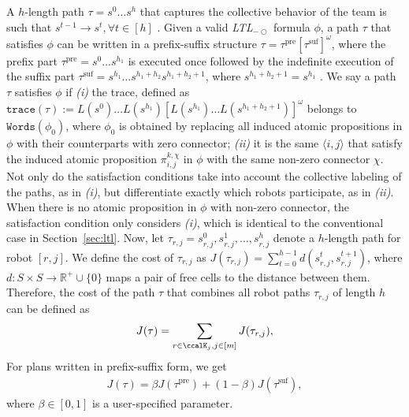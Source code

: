 \documentclass[Afour,sageh,times]{sagej}
\newcommand{\ltl}{ {\it LTL}$_{-\bigcirc}$ }
\newcommand{\ag}[2]{\langle#1,#2\rangle}
\renewcommand{\ap}[3]{\mathcal{\pi}_{{#1},{#2}}^{#3}}
\begin{document}
 A $h$-length path $\tau = s^0 \ldots s^h$ that captures the collective behavior of the team is such that $s^{t-1}\to s^{t}, \forall t\in[h]$%
 .  Given a valid\ltl formula $\phi$, a  path $\tau$ that satisfies $\phi$ can be written in a prefix-suffix structure $\tau=\tau^{\text{pre}}[\tau^{\text{suf}}]^\omega$, where the prefix part  $\tau^{\text{pre}}=s^0 \dots s^{h_1}$ is executed once followed by the indefinite execution of the suffix part $\tau^{\text{suf}}=s^{h_1} \dots s^{h_1+h_2} s^{h_1+h_2+1}$, where $s^{h_1+h_2+1}=s^{h_1}$ \cite{baier2008principles}. We say a path $\tau$ satisfies $\phi$ if {\it (i)} the trace, defined as $\texttt{trace}(\tau):=L(s^0)\dots L(s^{h_1})[L(s^{h_1})\dots L(s^{h_1+h_2+1})]^{\omega}$  belongs to $\texttt{Words}(\phi_0)$, where $\phi_0$ is obtained by replacing all induced atomic propositions in $\phi$ with their counterparts with zero connector; {\it (ii)} it is the same $\ag{i}{j}$ that satisfy the induced atomic proposition $\ap{i}{j}{k,\chi}$ in $\phi$ with the same non-zero connector $\chi$. Not only do the satisfaction conditions take into account the collective labeling of the paths, as in {\it (i)}, but differentiate exactly which robots participate, as in {\it (ii)}. When there is no atomic proposition in $\phi$ with non-zero connector, the satisfaction condition only considers {\it (i)}, which is identical to the conventional case in Section~\ref{sec:ltl}. Now, let $\tau_{r,j} = s_{r,j}^0, s_{r,j}^1, \ldots, s_{r,j}^h$ denote a $h$-length path  for robot $[r,j]$. We define the cost of $\tau_{r,j}$  as $J(\tau_{r,j}) = \sum_{t=0}^{h-1} d(s_{r,j}^{t}, s_{r,j}^{t+1})$, where $d: S\times S \to \mathbb{R}^+\cup\{0\}$ maps a pair of free cells to the distance between them. Therefore, the cost of the path $\tau$ that combines all robot paths $\tau_{r,j}$ of length $h$ can be defined as
\begingroup\makeatletter\def\f@size{10}\check@mathfonts
\def\maketag@@@#1{\hbox{\m@th\normalsize\normalfont#1}}%
\begin{align}
  J(\tau) = \sum_{{r \in \ccalK_j, j \in [m]}} J(\tau_{r,j}),
\end{align}
\endgroup
For  plans written in prefix-suffix form, we get
\begingroup\makeatletter\def\f@size{10}\check@mathfonts
\def\maketag@@@#1{\hbox{\m@th\normalsize\normalfont#1}}%
\begin{align}\label{eq:cost}
J(\tau) = \beta J(\tau^{\text{pre}}) + (1-\beta) J(\tau^{\text{suf}}),
\end{align}
\endgroup
where $\beta\in [0,1]$ is a user-specified parameter.
\end{document}
